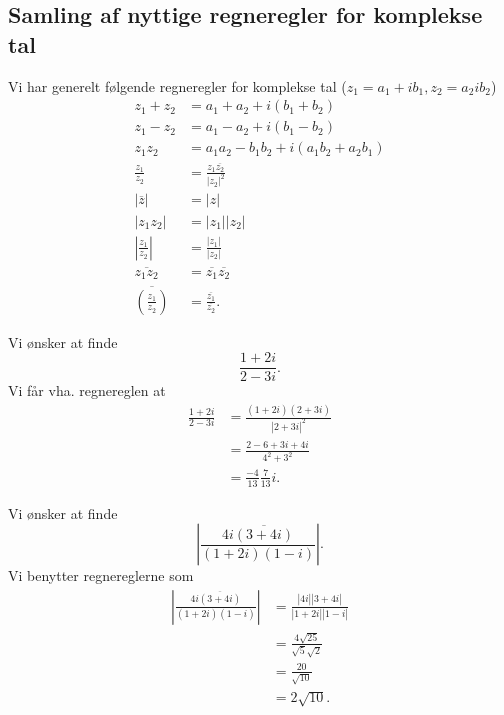 \subsection{Samling af nyttige regneregler for komplekse tal}
Vi har generelt følgende regneregler for komplekse tal ($z_1 = a_1 + ib_1, z_2 = a_2 ib_2$)
\begin{align*}
  z_1 + z_2 &= a_1 + a_2 + i(b_1 + b_2) \\
  z_1 - z_2 &= a_1 - a_2 + i(b_1 - b_2) \\
  z_1z_2 &=  a_1a_2 - b_1b_2 + i(a_1b_2 + a_2b_1) \\
  \frac{z_1}{z_2} &= \frac{z_1 \overline{z_2}}{|z_2|^2} \\
  |\overline{z}| &= |z| \\
  |z_1z_2| &= |z_1||z_2| \\
  \left| \frac{z_1}{z_2} \right| &= \frac{|z_1|}{|z_2|} \\
  \overline{z_1z_2} &= \overline{z_1} \overline{z_2} \\
  \overline{\left( \frac{z_1}{z_2} \right)} &= \frac{\overline{z_1}}{\overline{z_2}}
.\end{align*}

\begin{eks} 
  Vi ønsker at finde
  \[ 
  \frac{1 +2i}{2-3i}
  .\]
  \bigbreak
  Vi får vha. regnereglen at
  \begin{align*}
    \frac{1+2i}{2-3i} &= \frac{(1+2i)(2+3i)}{|2+3i|^2} \\
    &= \frac{2 - 6 + 3i + 4i}{4^2 + 3^2} \\
    &= \frac{-4}{13} \frac{7}{13}i
  .\end{align*}
\end{eks}

\begin{eks} 
  Vi ønsker at finde
  \[ 
  \left| \frac{4i \overline{(3+4i)}}{(1+2i)(1-i)} \right|
  .\]
  Vi benytter regnereglerne som
  \begin{align*}
  \left| \frac{4i \overline{(3+4i)}}{(1+2i)(1-i)} \right| &= \frac{|4i| |3+4i|}{|1+2i||1-i|} \\
  &= \frac{4 \sqrt{25}}{\sqrt{5}\sqrt{2}} \\
  &= \frac{20}{\sqrt{10}} \\
  &= 2 \sqrt{10}
  .\end{align*}
\end{eks}

